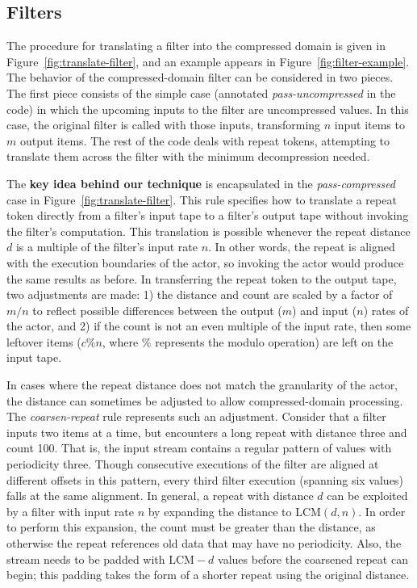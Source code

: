 \subsection*{Filters}

The procedure for translating a filter into the compressed domain is
given in Figure~\ref{fig:translate-filter}, and an example appears in
Figure~\ref{fig:filter-example}.  The behavior of the
compressed-domain filter can be considered in two pieces.  The first
piece consists of the simple case (annotated {\it pass-uncompressed}
in the code) in which the upcoming inputs to the filter are
uncompressed values.  In this case, the original filter is called with
those inputs, transforming $n$ input items to $m$ output items.  The
rest of the code deals with repeat tokens, attempting to translate
them across the filter with the minimum decompression needed.

The {\bf key idea behind our technique} is encapsulated in the {\it
  pass-compressed} case in Figure~\ref{fig:translate-filter}.  This
rule specifies how to translate a repeat token directly from a
filter's input tape to a filter's output tape without invoking the
filter's computation.  This translation is possible whenever the
repeat distance $d$ is a multiple of the filter's input rate $n$.  In
other words, the repeat is aligned with the execution boundaries of
the actor, so invoking the actor would produce the same results as
before.  In transferring the repeat token to the output tape, two
adjustments are made: 1) the distance and count are scaled by a factor
of $m/n$ to reflect possible differences between the output ($m$) and
input ($n$) rates of the actor, and 2) if the count is not an even
multiple of the input rate, then some leftover items ($c\%n$, where
$\%$ represents the modulo operation) are left on the input tape.

In cases where the repeat distance does not match the granularity of
the actor, the distance can sometimes be adjusted to allow
compressed-domain processing.  The {\it coarsen-repeat} rule
represents such an adjustment.  Consider that a filter inputs two
items at a time, but encounters a long repeat with distance three and
count 100.  That is, the input stream contains a regular pattern of
values with periodicity three.  Though consecutive executions of the
filter are aligned at different offsets in this pattern, every third
filter execution (spanning six values) falls at the same alignment.
In general, a repeat with distance $d$ can be exploited by a filter
with input rate $n$ by expanding the distance to $\mbox{LCM}(d, n)$.
In order to perform this expansion, the count must be greater than the
distance, as otherwise the repeat references old data that may have no
periodicity.  Also, the stream needs to be padded with $\mbox{LCM}-d$
values before the coarsened repeat can begin; this padding takes the
form of a shorter repeat using the original distance.

